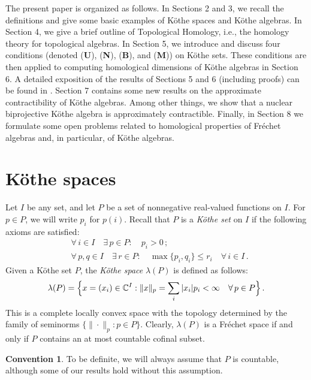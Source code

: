 \documentclass[12pt,reqno]{amsart}
\theoremstyle{definition}
\newtheorem*{convention}{Convention}
\begin{document}
The present paper is organized as follows. In Sections 2 and 3, we recall the definitions
and give some basic examples of K\"othe spaces and K\"othe algebras.
In Section 4, we give a brief outline of Topological Homology, i.e., the homology
theory for topological algebras. In Section 5, we introduce and discuss four conditions
(denoted ({\textbf{U}}), ({\textbf{N}}), ({\textbf{B}}), and ({\textbf{M}})) on K\"othe sets. These conditions
are then applied to computing homological dimensions of K\"othe algebras in Section 6.
A detailed exposition of the results of Sections 5 and 6 (including proofs) can be found in
\cite{Pir_bipr,Pir_bipr2,Pir_msb,Pir_QJM}.
Section 7 contains some new results on the approximate contractibility of K\"othe
algebras. Among other things, we show that a nuclear biprojective K\"othe algebra
is approximately contractible. Finally, in Section 8 we formulate some open
problems related to homological properties of Fr\'echet algebras
and, in particular, of K\"othe algebras.

\section{K\"othe spaces}

Let $I$ be any set, and let $P$ be a set of nonnegative real-valued functions on $I$.
For $p\in P$, we will write $p_i$ for $p(i)$.
Recall that $P$ is a {\em K\"othe set} on $I$ if the following axioms are
satisfied:
\begin{align*}
\tag*{(P1)}
&\forall\,i\in I\quad\exists\, p\in P:\quad p_i>0\, ;\\
\tag*{(P2)}
&\forall\, p,q\in I\quad\exists\, r\in P:\quad\max\{ p_i,q_i\}\le r_i\quad\forall\, i\in I\, .
\end{align*}
Given a K\"othe set $P$, the {\em K\"othe space}
$\lambda(P)$ is defined as follows:
\begin{equation*}
\lambda(P)=
\Bigl\{ x=(x_i)\in {\mathbb C}^I :
\| x\|_p=\sum_i |x_i|p_i <\infty\quad\forall\, p\in P\Bigr\}\, .
\end{equation*}
This is a complete locally convex space
with the topology determined by
the family of seminorms $\{\|\cdot\|_p : p\in P\}$. Clearly, $\lambda(P)$
is a Fr\'echet space if and only if $P$ contains an at most countable
cofinal subset.

\begin{convention}
To be definite, we will always assume that $P$ is countable, although some of
our results hold without this assumption.
\end{convention}
\end{document}
